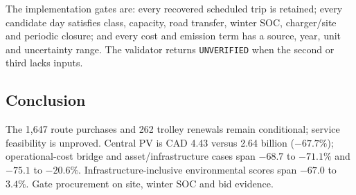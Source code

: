 \documentclass[12pt,letterpaper]{article}
\begin{document}
The implementation gates are: every recovered scheduled trip is retained; every candidate day satisfies class, capacity, road transfer, winter SOC, charger/site and periodic closure; and every cost and emission term has a source, year, unit and uncertainty range. The validator returns \texttt{UNVERIFIED} when the second or third lacks inputs.

\subsection{Conclusion}
The 1,647 route purchases and 262 trolley renewals remain conditional; service feasibility is unproved. Central PV is CAD 4.43 versus 2.64 billion ($-67.7\%$); operational-cost bridge and asset/infrastructure cases span $-68.7$ to $-71.1\%$ and $-75.1$ to $-20.6\%$. Infrastructure-inclusive environmental scores span $-67.0$ to $3.4\%$. Gate procurement on site, winter SOC and bid evidence.
\end{document}
